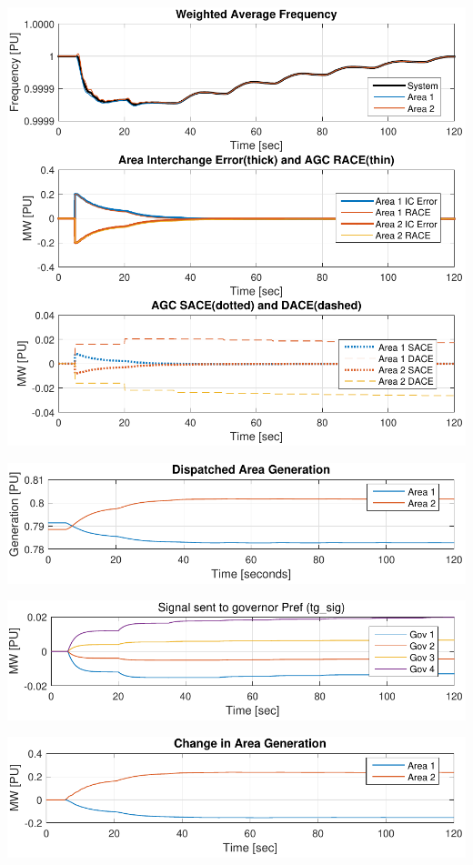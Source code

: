 \documentclass[12pt]{article}
\begin{document}
\begin{minipage}{.5\linewidth}

\includegraphics[width=\linewidth]{agcSigs}
\end{minipage}%
\begin{minipage}{.5\linewidth}

\includegraphics[width=\linewidth]{areaGen}

\vspace{1em}
\includegraphics[width=\linewidth]{tgSigs}

\vspace{1em}
\includegraphics[width=\linewidth]{changeGen}
\end{minipage}
\end{document}
